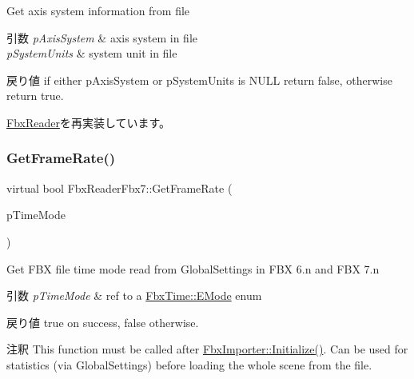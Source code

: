 Get axis system information from file 
\begin{DoxyParams}{引数}
{\em p\+Axis\+System} & axis system in file \\
\hline
{\em p\+System\+Units} & system unit in file \\
\hline
\end{DoxyParams}
\begin{DoxyReturn}{戻り値}
if either p\+Axis\+System or p\+System\+Units is {\ttfamily N\+U\+LL} return {\ttfamily false}, otherwise return {\ttfamily true}. 
\end{DoxyReturn}


\hyperlink{class_fbx_reader_a73e58c3f7734250f0f8ffaef96b2df3f}{Fbx\+Reader}を再実装しています。

\mbox{\label{class_fbx_reader_fbx7_a4aac7f6892348dd1f8fe5129cbfc2cc1}} 
\subsubsection{\texorpdfstring{Get\+Frame\+Rate()}{GetFrameRate()}}
{\footnotesize\ttfamily virtual bool Fbx\+Reader\+Fbx7\+::\+Get\+Frame\+Rate (\begin{DoxyParamCaption}\item[{\hyperlink{class_fbx_time_acc529b00a0e8d4c3da3702449ca93031}{Fbx\+Time\+::\+E\+Mode} \&}]{p\+Time\+Mode }\end{DoxyParamCaption})\hspace{0.3cm}{\ttfamily [virtual]}}

Get F\+BX file time mode read from Global\+Settings in F\+BX 6.\+n and F\+BX 7.\+n 
\begin{DoxyParams}{引数}
{\em p\+Time\+Mode} & ref to a \hyperlink{class_fbx_time_acc529b00a0e8d4c3da3702449ca93031}{Fbx\+Time\+::\+E\+Mode} enum \\
\hline
\end{DoxyParams}
\begin{DoxyReturn}{戻り値}
{\ttfamily true} on success, {\ttfamily false} otherwise. 
\end{DoxyReturn}
\begin{DoxyRemark}{注釈}
This function must be called after \hyperlink{class_fbx_importer_a70528a9ca1ff737bda9696a2073acd13}{Fbx\+Importer\+::\+Initialize()}. Can be used for statistics (via Global\+Settings) before loading the whole scene from the file. 
\end{DoxyRemark}


